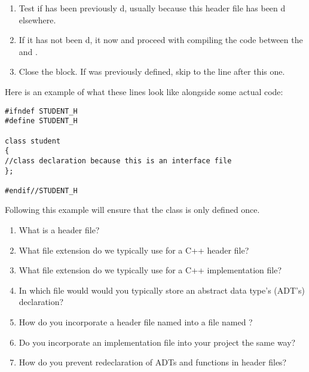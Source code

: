 \begin{enumerate}
\item Test if  has been previously d, usually because this header file has been d elsewhere.
\item If it has not been d,  it now and proceed with compiling the code between the  and .
\item Close the  block. If  was previously defined, skip to the line after this one.
\end{enumerate}

Here is an example of what these lines look like alongside some actual code:

\noindent\begin{minipage}{\linewidth}\begin{lstlisting}
#ifndef STUDENT_H
#define STUDENT_H

class student
{
//class declaration because this is an interface file
};

#endif//STUDENT_H
\end{lstlisting}\end{minipage}

Following this example will ensure that the  class is only defined once.



\begin{enumerate}
	\item What is a header file?

	\item What file extension do we typically use for a C++ header file?

	\item What file extension do we typically use for a C++ implementation file?

  \item In which file would would you typically store an abstract data type's (ADT's) declaration?

	\item How do you incorporate a header file named  into a file named ?

	\item Do you incorporate an implementation file into your project the same way?

	\item How do you prevent redeclaration of ADTs and functions in header files?
\end{enumerate}

